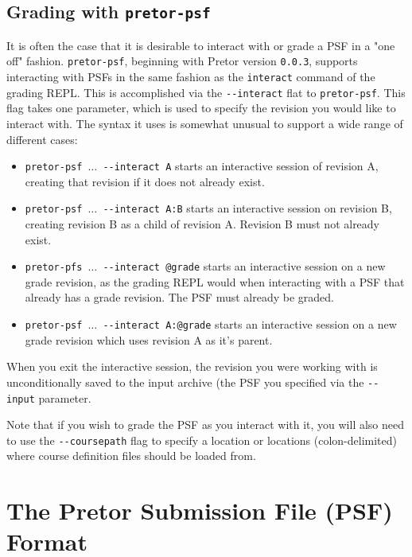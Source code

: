 \documentclass{book}
\begin{document}
\section{Grading with \texttt{pretor-psf}}

It is often the case that it is desirable to interact with or grade a PSF in a
"one off" fashion. \texttt{pretor-psf}, beginning with Pretor version
\texttt{0.0.3}, supports interacting with PSFs in the same fashion as the
\texttt{interact} command of the grading REPL. This is accomplished via the
\texttt{-{}-interact} flat to \texttt{pretor-psf}. This flag takes one
parameter, which is used to specify the revision you would like to interact
with. The syntax it uses is somewhat unusual to support a wide range of
different cases:

\begin{itemize}

	\item \texttt{pretor-psf $\hdots$ -{}-interact A} starts an interactive
		session of revision A, creating that revision if it does not
		already exist.

	\item \texttt{pretor-psf $\hdots$ -{}-interact A:B} starts an
		interactive session on revision B, creating revision B as a
		child of revision A. Revision B must not already exist.

	\item \texttt{pretor-pfs $\hdots$ -{}-interact @grade} starts an
		interactive session on a new grade revision, as the grading
		REPL would when interacting with a PSF that already has a grade
		revision. The PSF must already be graded.

	\item \texttt{pretor-psf $\hdots$ -{}-interact A:@grade} starts an
		interactive session on a new grade revision which uses revision
		A as it's parent.

\end{itemize}

When you exit the interactive session, the revision you were working with is
unconditionally saved to the input archive (the PSF you specified via the
\texttt{-{}-input} parameter.

Note that if you wish to grade the PSF as you interact with it, you will also
need to use the \texttt{-{}-coursepath} flag to specify a location or locations
(colon-delimited) where course definition files should be loaded from.

\chapter{The Pretor Submission File (PSF) Format}
\end{document}
